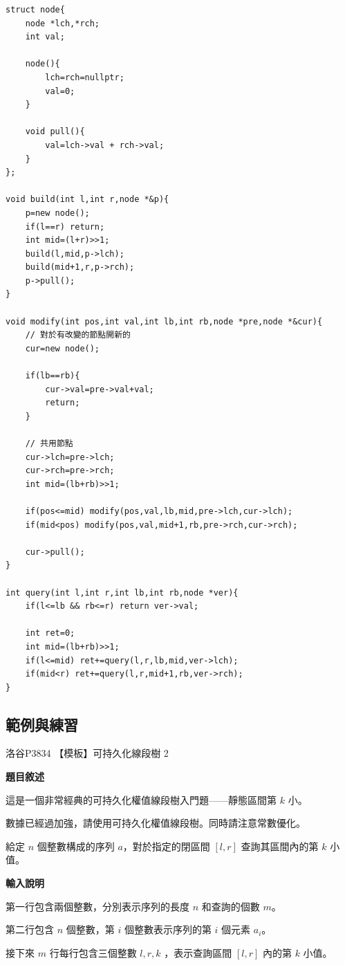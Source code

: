 \begin{lstlisting}[caption=持久化線段樹]
struct node{
    node *lch,*rch;
    int val;
    
    node(){
        lch=rch=nullptr;
        val=0;
    }
    
    void pull(){
        val=lch->val + rch->val;
    }
};

void build(int l,int r,node *&p){
    p=new node();
    if(l==r) return;
    int mid=(l+r)>>1;
    build(l,mid,p->lch);
    build(mid+1,r,p->rch);
    p->pull();
}

void modify(int pos,int val,int lb,int rb,node *pre,node *&cur){
    // 對於有改變的節點開新的
    cur=new node();
    
    if(lb==rb){
        cur->val=pre->val+val;
        return;
    }
    
    // 共用節點
    cur->lch=pre->lch;
    cur->rch=pre->rch;
    int mid=(lb+rb)>>1;
    
    if(pos<=mid) modify(pos,val,lb,mid,pre->lch,cur->lch);
    if(mid<pos) modify(pos,val,mid+1,rb,pre->rch,cur->rch);
    
    cur->pull();
}

int query(int l,int r,int lb,int rb,node *ver){
    if(l<=lb && rb<=r) return ver->val;
    
    int ret=0;
    int mid=(lb+rb)>>1;
    if(l<=mid) ret+=query(l,r,lb,mid,ver->lch);
    if(mid<r) ret+=query(l,r,mid+1,rb,ver->rch);
}
\end{lstlisting}

    \subsection{範例與練習}

    \example 洛谷P3834 【模板】可持久化線段樹 2

    \textbf{題目敘述}

    這是一個非常經典的可持久化權值線段樹入門題——靜態區間第 $k$ 小。

    數據已經過加強，請使用可持久化權值線段樹。同時請注意常數優化。

    給定 $n$ 個整數構成的序列 $a$，對於指定的閉區間 $[l, r]$ 查詢其區間內的第 $k$ 小值。

    \textbf{輸入說明}

    第一行包含兩個整數，分別表示序列的長度 $n$ 和查詢的個數 $m$。
    
    第二行包含 $n$ 個整數，第 $i$ 個整數表示序列的第 $i$ 個元素 $a_i$。
    
    接下來 $m$ 行每行包含三個整數 $ l, r, k$ ，表示查詢區間 $[l, r]$ 內的第 $k$ 小值。

